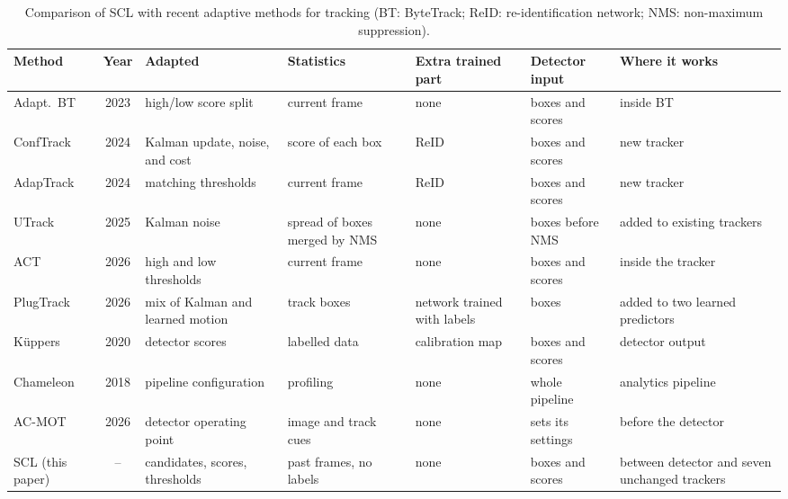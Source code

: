 \documentclass[pdflatex,sn-mathphys-num,iicol]{sn-jnl}
\newcommand{\scl}{SCL}
\begin{document}
\begin{table}[t]
\caption{Comparison of \scl{} with recent adaptive methods for tracking (BT: ByteTrack; ReID: re-identification network; NMS: non-maximum suppression).}
\label{tab:related}
\centering\footnotesize
\setlength{\tabcolsep}{4pt}
\begin{tabular}{@{}>{\raggedright\arraybackslash}p{24mm}c>{\raggedright\arraybackslash}p{30mm}>{\raggedright\arraybackslash}p{26mm}>{\raggedright\arraybackslash}p{19mm}>{\raggedright\arraybackslash}p{20mm}>{\raggedright\arraybackslash}p{28mm}@{}}
\toprule
Method & Year & Adapted & Statistics & Extra trained part & Detector input & Where it works\\
\midrule
Adapt.\ BT \cite{ma2023adaptivebytetrack} & 2023 & high/low score split & current frame & none & boxes and scores & inside BT\\
ConfTrack \cite{jung2024conftrack} & 2024 & Kalman update, noise, and cost & score of each box & ReID & boxes and scores & new tracker\\
AdapTrack \cite{shim2024adaptrack} & 2024 & matching thresholds & current frame & ReID & boxes and scores & new tracker\\
UTrack \cite{solano2025utrack} & 2025 & Kalman noise & spread of boxes merged by NMS & none & boxes before NMS & added to existing trackers\\
ACT \cite{act2026adaptive} & 2026 & high and low thresholds & current frame & none & boxes and scores & inside the tracker\\
PlugTrack \cite{kim2026plugtrack} & 2026 & mix of Kalman and learned motion & track boxes & network trained with labels & boxes & added to two learned predictors\\
K{\"u}ppers \cite{kuppers2020detcalib} & 2020 & detector scores & labelled data & calibration map & boxes and scores & detector output\\
Chameleon \cite{jiang2018chameleon} & 2018 & pipeline configuration & profiling & none & whole pipeline & analytics pipeline\\
AC-MOT \cite{ismail2026acmot} & 2026 & detector operating point & image and track cues & none & sets its settings & before the detector\\
\scl{} (this paper) & -- & candidates, scores, thresholds & past frames, no labels & none & boxes and scores & between detector and seven unchanged trackers\\
\bottomrule
\end{tabular}
\end{table}
\end{document}
